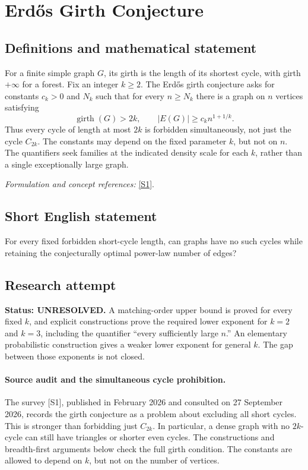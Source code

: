 \documentclass[11pt]{article}
\begin{document}
\section*{\texorpdfstring{Erdős Girth Conjecture}{Erdős Girth Conjecture}}\label{320}
\subsection{Definitions and mathematical statement}
For a finite simple graph $G$, its girth is the length of its shortest cycle, with girth $+\infty$ for a forest. Fix an integer $k\ge2$. The Erd\H{o}s girth conjecture asks for constants $c_k>0$ and $N_k$ such that for every $n\ge N_k$ there is a graph on $n$ vertices satisfying
\[
 \operatorname{girth}(G)>2k,
 \qquad |E(G)|\ge c_k n^{1+1/k}.
\]
Thus every cycle of length at most $2k$ is forbidden simultaneously, not just the cycle $C_{2k}$. The constants may depend on the fixed parameter $k$, but not on $n$. The quantifiers seek families at the indicated density scale for each $k$, rather than a single exceptionally large graph.
\par\smallskip\textit{Formulation and concept references:} \href{https://www.combinatorics.org/ojs/index.php/eljc/article/download/ds27/pdf}{[S1]}.

\subsection{Short English statement}
For every fixed forbidden short-cycle length, can graphs have no such cycles while retaining the conjecturally optimal power-law number of edges?
\subsection{Research attempt}
\textbf{Status: UNRESOLVED.} A matching-order upper bound is proved for every fixed $k$, and explicit constructions prove the required lower exponent for $k=2$ and $k=3$, including the quantifier ``every sufficiently large $n$.'' An elementary probabilistic construction gives a weaker lower exponent for general $k$. The gap between those exponents is not closed.

\paragraph{Source audit and the simultaneous cycle prohibition.}
The survey [S1], published in February 2026 and consulted on 27 September 2026, records the girth conjecture as a problem about excluding all short cycles. This is stronger than forbidding just $C_{2k}$. In particular, a dense graph with no $2k$-cycle can still have triangles or shorter even cycles. The constructions and breadth-first arguments below check the full girth condition. The constants are allowed to depend on $k$, but not on the number of vertices.
\end{document}
